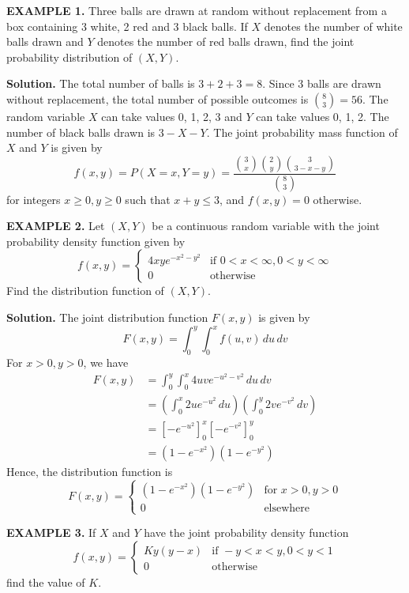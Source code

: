 \documentclass{article}
\begin{document}
\textbf{EXAMPLE 1.} Three balls are drawn at random without replacement from a box containing 3 white, 2 red and 3 black balls. If $X$ denotes the number of white balls drawn and $Y$ denotes the number of red balls drawn, find the joint probability distribution of $(X,Y)$.

\textbf{Solution.} The total number of balls is $3 + 2 + 3 = 8$. Since 3 balls are drawn without replacement, the total number of possible outcomes is $\binom{8}{3} = 56$.
The random variable $X$ can take values 0, 1, 2, 3 and $Y$ can take values 0, 1, 2. The number of black balls drawn is $3-X-Y$. 
The joint probability mass function of $X$ and $Y$ is given by
$$f(x,y) = P(X=x, Y=y) = \frac{\binom{3}{x} \binom{2}{y} \binom{3}{3-x-y}}{\binom{8}{3}}$$
for integers $x \ge 0, y \ge 0$ such that $x+y \le 3$, and $f(x,y) = 0$ otherwise.

\vspace{1em}

\textbf{EXAMPLE 2.} Let $(X,Y)$ be a continuous random variable with the joint probability density function given by
$$
f(x,y) = \begin{cases} 4xye^{-x^2-y^2} & \text{if } 0 < x < \infty, 0 < y < \infty \\ 0 & \text{otherwise} \end{cases}
$$
Find the distribution function of $(X,Y)$.

\textbf{Solution.} The joint distribution function $F(x,y)$ is given by
$$F(x,y) = \int_{0}^{y} \int_{0}^{x} f(u,v) \,du \,dv$$
For $x > 0, y > 0$, we have
\begin{align*}
F(x,y) &= \int_{0}^{y} \int_{0}^{x} 4uve^{-u^2-v^2} \,du \,dv \\
&= \left( \int_{0}^{x} 2ue^{-u^2} \,du \right) \left( \int_{0}^{y} 2ve^{-v^2} \,dv \right) \\
&= \left[ -e^{-u^2} \right]_{0}^{x} \left[ -e^{-v^2} \right]_{0}^{y} \\
&= (1 - e^{-x^2})(1 - e^{-y^2})
\end{align*}
Hence, the distribution function is
$$
F(x,y) = \begin{cases} (1 - e^{-x^2})(1 - e^{-y^2}) & \text{for } x > 0, y > 0 \\ 0 & \text{elsewhere} \end{cases}
$$

\vspace{1em}

\textbf{EXAMPLE 3.} If $X$ and $Y$ have the joint probability density function
$$
f(x,y) = \begin{cases} Ky(y-x) & \text{if } -y < x < y, 0 < y < 1 \\ 0 & \text{otherwise} \end{cases}
$$
find the value of $K$.
\end{document}
